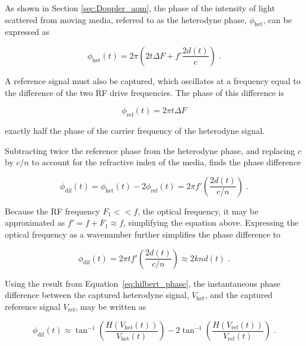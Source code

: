 As shown in Section \ref{sec:Doppler_aom}, the phase of the intensity of light scattered from moving media, referred to as the heterodyne phase, $\phi_{\mathrm{het}}$, can be expressed as

\begin{equation}
\phi_{\mathrm{het}}(t) = 2 \pi \left(2 t \Delta F + f'  \frac{2 d(t)}{c}    \right) \; .
\end{equation}

A reference signal must also be captured, which oscillates at a frequency equal to the difference of the two RF drive frequencies. The phase of this difference is

\begin{equation}
\phi_{\mathrm{ref}}(t) = 2 \pi t \Delta F
\end{equation}

\noindent exactly half the phase of the carrier frequency of the heterodyne signal.

Subtracting twice the reference phase from the heterodyne phase, and replacing $c$ by $c/n$ to account for the refractive index of the media, finds the phase difference

\begin{equation}
\phi_{\mathrm{dif}}(t) = \phi_{\mathrm{het}}(t) - 2 \phi_{\mathrm{ref}}(t) = 2 \pi f' \left( \frac{2 d(t)}{c/n} \right) \; .
\end{equation}

Because the RF frequency $F_1 << f$, the optical frequency, it may be approximated as $f' = f + F_1 \approx f$, simplifying the equation above. Expressing the optical frequency as a wavenumber further simplifies the phase difference to %

\begin{equation}
\phi_{\mathrm{dif}}(t) = 2 \pi t f'  \left( \frac{2 d(t)}{c/n} \right) \approx 2 k n d(t) \; .
\label{eq:phi_diff}
\end{equation}

Using the result from Equation~\ref{eq:hilbert_phase}, the instantaneous phase difference between the captured heterodyne signal, $V_{\mathrm{het}}$, and the captured reference signal $V_{\mathrm{ref}}$, may be written as

\begin{equation}
\phi_{\mathrm{dif}}(t) \approx \tan^{-1}\left( \frac{H(V_{\mathrm{het}}(t))}{V_{\mathrm{het}}(t)} \right) - 2\tan^{-1}\left( \frac{H(V_{\mathrm{ref}}(t))}{V_{\mathrm{ref}}(t)} \right) \; .
\label{eq:phi_diff2}
\end{equation}

